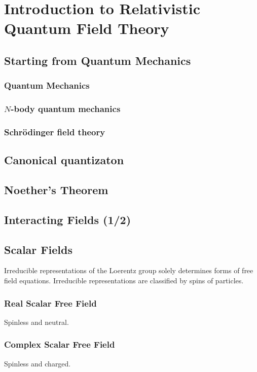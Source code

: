 \documentclass{jarticle}
\newcommand{\myqftsrcdirectory}[0]{./}
\newcommand{\mainqftsrcdirectory}[0]{../../../src_qft}
\begin{document}
\section{Introduction to Relativistic Quantum Field Theory}
\subsection{Starting from Quantum Mechanics}
\subsubsection{Quantum Mechanics}

\subsubsection{$N$-body quantum mechanics}

\subsubsection{Schr\"odinger field theory}

\subsection{Canonical quantizaton}

\subsection{Noether's Theorem}

\subsection{Interacting Fields (1/2)}


\subsection{Scalar Fields}
Irreducible representations of the Loerentz group solely 
determines forms of free field equations.
Irreducible representations are classified by
spins of particles.
\subsubsection{Real Scalar Free Field}
Spinless and neutral.

\subsubsection{Complex Scalar Free Field}
Spinless and charged.

\end{document}
